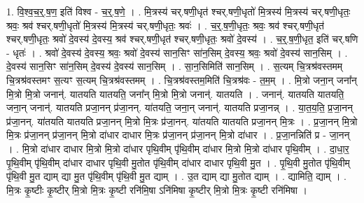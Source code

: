 \documentclass[17pt]{extarticle}
\begin{document}
1. वि॒श्व॒च॒र्॒.ष॒ण॒ इति॑ विश्व - च॒र्॒.ष॒णे॒ । . मि॒त्रस्य॑ चर्.षणी॒धृत॑ श्चर्.षणी॒धृतो॑ मि॒त्रस्य॑ मि॒त्रस्य॑ चर्.षणी॒धृतः॒ श्रवः॒ श्रव॑ श्चर्.षणी॒धृतो॑ मि॒त्रस्य॑ मि॒त्रस्य॑ चर्.षणी॒धृतः॒ श्रवः॑ । . च॒र्॒.ष॒णी॒धृतः॒ श्रवः॒ श्रव॑ श्चर्.षणी॒धृत॑ श्चर्.षणी॒धृतः॒ श्रवो॑ दे॒वस्य॑ दे॒वस्य॒ श्रव॑ श्चर्.षणी॒धृत॑ श्चर्.षणी॒धृतः॒ श्रवो॑ दे॒वस्य॑ । . च॒र्॒.ष॒णी॒धृत॒ इति॑ चर्.षणि - धृतः॑ । . श्रवो॑ दे॒वस्य॑ दे॒वस्य॒ श्रवः॒ श्रवो॑ दे॒वस्य॑ सान॒सिꣳ सा॑न॒सिम् दे॒वस्य॒ श्रवः॒ श्रवो॑ दे॒वस्य॑ सान॒सिम् । . दे॒वस्य॑ सान॒सिꣳ सा॑न॒सिम् दे॒वस्य॑ दे॒वस्य॑ सान॒सिम् । . सा॒न॒सिमिति॑ सान॒सिम् । . स॒त्यम् चि॒त्रश्र॑वस्तमम् चि॒त्रश्र॑वस्तमꣳ स॒त्यꣳ स॒त्यम् चि॒त्रश्र॑वस्तमम् । . चि॒त्रश्र॑वस्तम॒मिति॑ चि॒त्रश्र॑वः - त॒म॒म् । . मि॒त्रो जना॒न् जना᳚न् मि॒त्रो मि॒त्रो जनान्॑. यातयति यातयति॒ जना᳚न् मि॒त्रो मि॒त्रो जनान्॑. यातयति । . जनान्॑. यातयति यातयति॒ जना॒न् जनान्॑. यातयति प्रजा॒नन् प्र॑जा॒नन्. या॑तयति॒ जना॒न् जनान्॑. यातयति प्रजा॒नन्न् । . या॒त॒य॒ति॒ प्र॒जा॒नन् प्र॑जा॒नन्. या॑तयति यातयति प्रजा॒नन् मि॒त्रो मि॒त्रः प्र॑जा॒नन्. या॑तयति यातयति प्रजा॒नन् मि॒त्रः । . प्र॒जा॒नन् मि॒त्रो मि॒त्रः प्र॑जा॒नन् प्र॑जा॒नन् मि॒त्रो दा॑धार दाधार मि॒त्रः प्र॑जा॒नन् प्र॑जा॒नन् मि॒त्रो दा॑धार । . प्र॒जा॒नन्निति॑ प्र - जा॒नन् । . मि॒त्रो दा॑धार दाधार मि॒त्रो मि॒त्रो दा॑धार पृथि॒वीम् पृ॑थि॒वीम् दा॑धार मि॒त्रो मि॒त्रो दा॑धार पृथि॒वीम् । . दा॒धा॒र॒ पृ॒थि॒वीम् पृ॑थि॒वीम् दा॑धार दाधार पृथि॒वी मु॒तोत पृ॑थि॒वीम् दा॑धार दाधार पृथि॒वी मु॒त । . पृ॒थि॒वी मु॒तोत पृ॑थि॒वीम् पृ॑थि॒वी मु॒त द्याम् द्या मु॒त पृ॑थि॒वीम् पृ॑थि॒वी मु॒त द्याम् । . उ॒त द्याम् द्या मु॒तोत द्याम् । . द्यामिति॒ द्याम् । . मि॒त्रः कृ॒ष्टीः कृ॒ष्टीर् मि॒त्रो मि॒त्रः कृ॒ष्टी रनि॑मि॒षा ऽनि॑मिषा कृ॒ष्टीर् मि॒त्रो मि॒त्रः कृ॒ष्टी रनि॑मिषा । \newline
\end{document}
